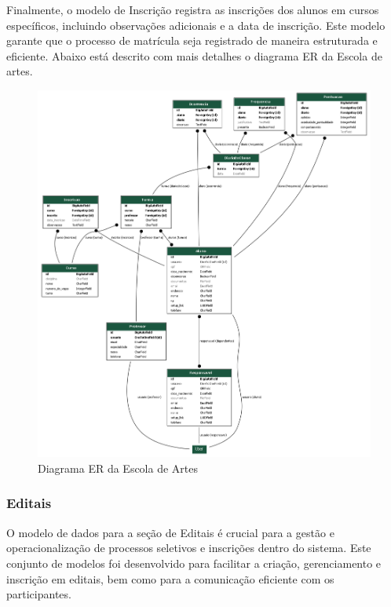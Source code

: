 Finalmente, o modelo de Inscrição registra as inscrições dos alunos em cursos específicos, incluindo observações adicionais e a data de inscrição. Este modelo garante que o processo de matrícula seja registrado de maneira estruturada e eficiente. Abaixo está descrito com mais detalhes o diagrama ER da Escola de artes.


\begin{figure}[htb]
	\centering
	 \begin{minipage}{0.4\textwidth}
	   \centering
	   \caption{Diagrama ER da Escola de Artes} \label{er_diagram_escola}
	   \includegraphics[scale=0.25]{./img/er_diagram_escola.png}
	 \end{minipage}
   \end{figure}

\subsubsection{Editais}

O modelo de dados para a seção de Editais é crucial para a gestão e operacionalização de processos seletivos e inscrições dentro do sistema. Este conjunto de modelos foi desenvolvido para facilitar a criação, gerenciamento e inscrição em editais, bem como para a comunicação eficiente com os participantes.

